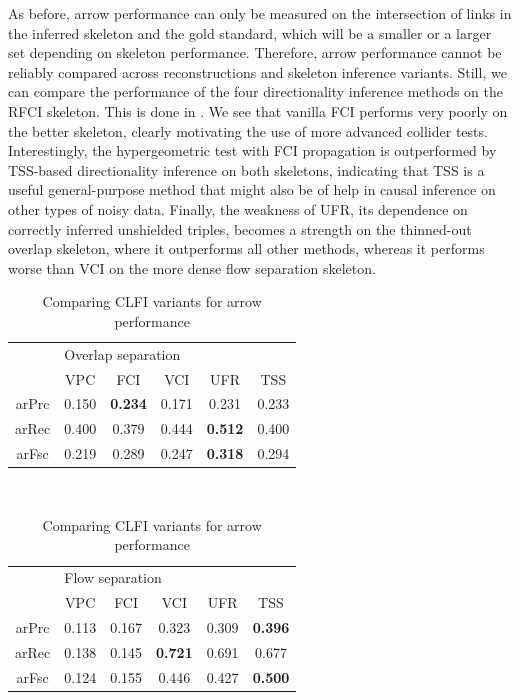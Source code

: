 As before, arrow performance can only be measured on the intersection of links in the inferred skeleton and the gold standard, which will be a smaller or a larger set depending on skeleton performance. Therefore, arrow performance cannot be reliably compared across reconstructions and skeleton inference variants. Still, we can compare the performance of the four directionality inference methods on the RFCI skeleton. This is done in . We see that vanilla FCI performs very poorly on the better skeleton, clearly motivating the use of more advanced collider tests. Interestingly, the hypergeometric test with FCI propagation is outperformed by TSS-based directionality inference on both skeletons, indicating that TSS is a useful general-purpose method that might also be of help in causal inference on other types of noisy data. Finally, the weakness of UFR, its dependence on correctly inferred unshielded triples, becomes a strength on the thinned-out overlap skeleton, 
where it outperforms all other methods, whereas it performs worse than VCI on the more dense flow separation skeleton.

\begin{table}
 \centering
 \begin{tabular}{cccccc}
 \hline \hline
   & \multicolumn{5}{l}{Overlap separation}\\ 
        &   VPC &   FCI &   VCI &   UFR &   TSS\\ 
 \hline
  arPrc & 0.150 & \textbf{0.234} & 0.171 & 0.231 & 0.233\\
  arRec & 0.400 & 0.379 & 0.444 & \textbf{0.512} & 0.400\\
  arFsc & 0.219 & 0.289 & 0.247 & \textbf{0.318} & 0.294\\
  \hline
 \end{tabular}\\[0.5cm]
  \begin{tabular}{cccccc}
 \hline \hline
   & \multicolumn{5}{l}{Flow separation}\\ 
        &   VPC &   FCI &   VCI &   UFR &   TSS\\ 
 \hline
  arPrc & 0.113 & 0.167 & 0.323 & 0.309 & \textbf{0.396}\\
  arRec & 0.138 & 0.145 & \textbf{0.721} & 0.691 & 0.677\\
  arFsc & 0.124 & 0.155 & 0.446 & 0.427 & \textbf{0.500}\\
  \hline
 \end{tabular}
 \caption{Comparing CLFI variants for arrow performance}
 \label{contact-arrow-evaluation-nelex}
\end{table}

